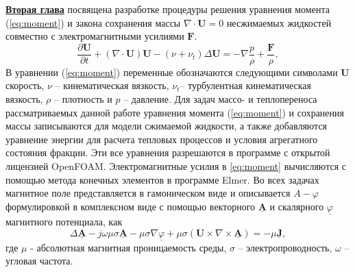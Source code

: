 \underline{\textbf{Вторая глава}} посвящена разработке процедуры решения уравнения момента (\ref{eq:moment}) и закона сохранения массы $ \nabla \cdot \mathbf{U} = 0$ несжимаемых жидкостей совместно с электромагнитными усилиями $\mathbf{F}$.
\begin{equation}
	\frac{\partial\mathbf{U}}{\partial t} +\left( \nabla \cdot \mathbf{U} \right) \mathbf{U} - \left( \nu + \nu_t \right) \Delta \mathbf{U} = -\nabla \frac{p}{\rho} + \frac{\mathbf{F}}{\rho},
	\label{eq:moment}
\end{equation}
В уравнении (\ref{eq:moment}) переменные обозначаются следующими символами  $\mathbf{U}$ скорость, $\nu$ -- кинематическая вязкость, $\nu_{t}$-- турбулентная кинематическая вязкость, $\rho$ -- плотность и $p$ -- давление. 
Для задач массо- и теплопереноса рассматриваемых данной работе уравнения момента (\ref{eq:moment}) и сохранения массы записываются для модели сжимаемой жидкости, а также добавляются уравнение энергии для расчета тепловых процессов и условия агрегатного состояния фракции. Эти все уравнения разрешаются в программе с открытой лицензией OpenFOAM. Электромагнитные усилия в \ref{eq:moment} вычисляются с помощью метода конечных элементов в программе Elmer. Во всех задачах магнитное поле представляется в гамоническом виде и описывается $A-\varphi$ формулировкой в комплексном виде с помощью векторного $\mathbf{\underline{A}}$ и скалярного $\underline{\varphi}$ магнитного потенциала, как
\begin{equation}
	\Delta \mathbf{\underline{A}}-j\omega \mu \sigma \mathbf{\underline{A}}-\mu \sigma \nabla \underline{\varphi}+\mu \sigma (\mathbf{U}\times \nabla \times \mathbf{\underline{A}})=-\mu \mathbf{\underline{J}},	
	\label{eq:Aphi}
\end{equation}
где $\mu$ - абсолютная магнитная проницаемость среды, $\sigma$ -- электропроводность, $\omega$ -- угловая частота.
 
